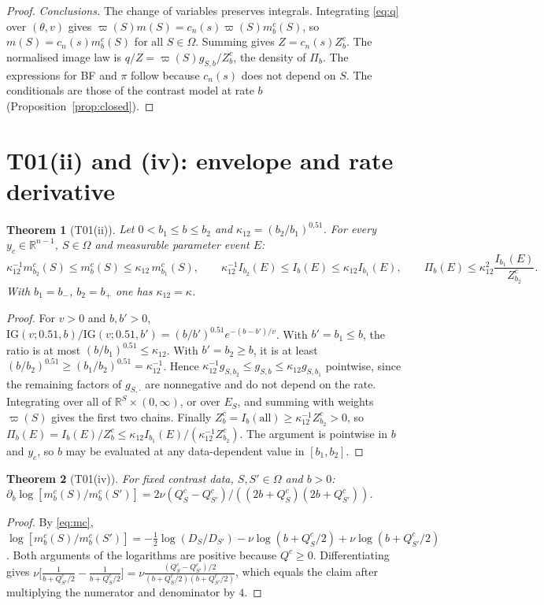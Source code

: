 \documentclass[11pt]{article}
\newtheorem{theorem}{Theorem}[section]
\theoremstyle{remark}
\newcommand{\R}{\mathbb R}
\newcommand{\IG}{\mathrm{IG}}
\newcommand{\vp}{\varpi}
\newcommand{\Om}{\Omega}
\newcommand{\yc}{y_c}
\newcommand{\bm}{b_-}
\newcommand{\bp}{b_+}
\begin{document}
\begin{proof}
\emph{Conclusions.} The change of variables preserves integrals. Integrating \eqref{eq:q} over $(\theta,v)$ gives $\vp(S)m(S)=c_n(s)\vp(S)m^c_b(S)$, so $m(S)=c_n(s)m^c_b(S)$ for all $S\in\Om$. Summing gives $Z=c_n(s)Z^c_b$. The normalised image law is $q/Z=\vp(S)g_{S,b}/Z^c_b$, the density of $\Pi_b$. The expressions for BF and $\pi$ follow because $c_n(s)$ does not depend on $S$. The conditionals are those of the contrast model at rate $b$ (Proposition~\ref{prop:closed}).
\end{proof}

\section{T01(ii) and (iv): envelope and rate derivative}\label{sec:T01ii}

\begin{theorem}[T01(ii)]\label{thm:T01ii}
Let $0<b_1\le b\le b_2$ and $\kappa_{12}=(b_2/b_1)^{0.51}$. For every $\yc\in\R^{n-1}$, $S\in\Om$ and measurable parameter event $E$:
\[
\kappa_{12}^{-1}m^c_{b_2}(S)\le m^c_b(S)\le\kappa_{12}\, m^c_{b_1}(S),\qquad \kappa_{12}^{-1}I_{b_2}(E)\le I_b(E)\le\kappa_{12} I_{b_1}(E),\qquad \Pi_b(E)\le\kappa_{12}^2\frac{I_{b_1}(E)}{Z^c_{b_2}} .
\]
With $b_1=\bm$, $b_2=\bp$ one has $\kappa_{12}=\kappa$.
\end{theorem}
\begin{proof}
For $v>0$ and $b,b'>0$, $\IG(v;0.51,b)/\IG(v;0.51,b')=(b/b')^{0.51}e^{-(b-b')/v}$. With $b'=b_1\le b$, the ratio is at most $(b/b_1)^{0.51}\le\kappa_{12}$. With $b'=b_2\ge b$, it is at least $(b/b_2)^{0.51}\ge(b_1/b_2)^{0.51}=\kappa_{12}^{-1}$. Hence $\kappa_{12}^{-1}g_{S,b_2}\le g_{S,b}\le\kappa_{12} g_{S,b_1}$ pointwise, since the remaining factors of $g_{S,\cdot}$ are nonnegative and do not depend on the rate. Integrating over all of $\R^S\times(0,\infty)$, or over $E_S$, and summing with weights $\vp(S)$ gives the first two chains. Finally $Z^c_b=I_b(\text{all})\ge\kappa_{12}^{-1}Z^c_{b_2}>0$, so $\Pi_b(E)=I_b(E)/Z^c_b\le\kappa_{12} I_{b_1}(E)/(\kappa_{12}^{-1}Z^c_{b_2})$. The argument is pointwise in $b$ and $\yc$, so $b$ may be evaluated at any data-dependent value in $[b_1,b_2]$.
\end{proof}

\begin{theorem}[T01(iv)]\label{thm:T01iv}
For fixed contrast data, $S,S'\in\Om$ and $b>0$:
$\partial_b\log[m^c_b(S)/m^c_b(S')]=2\nu(Q^c_S-Q^c_{S'})/((2b+Q^c_S)(2b+Q^c_{S'}))$.
\end{theorem}
\begin{proof}
By \eqref{eq:mc}, $\log[m^c_b(S)/m^c_b(S')]=-\frac12\log(D_S/D_{S'})-\nu\log(b+Q^c_S/2)+\nu\log(b+Q^c_{S'}/2)$. Both arguments of the logarithms are positive because $Q^c\ge0$. Differentiating gives $\nu\big[\frac1{b+Q^c_{S'}/2}-\frac1{b+Q^c_S/2}\big]=\nu\frac{(Q^c_S-Q^c_{S'})/2}{(b+Q^c_S/2)(b+Q^c_{S'}/2)}$, which equals the claim after multiplying the numerator and denominator by $4$.
\end{proof}
\end{document}
